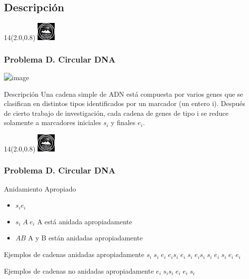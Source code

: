 \documentclass[10pt,xcolor=tables,{dvipsnames}]{beamer}
\newcommand{\MyLogo}{%
	\begin{textblock}{14}(2.0,0.8)
		\includegraphics[height=0.925cm, angle=0]{UOWhite}
	\end{textblock}
}
\begin{document}
   	\subsection{Descripción}
     
         	
    	    	\begin{frame}
    	    		\MyLogo
    	    		\frametitle{Problema D. Circular DNA}
    	    		\begin{center}
    	    		\includegraphics<1->[scale=0.1]{DNAFoto}
    	    		\end{center}
    	    		\begin{block}{Descripción}
    	    			\justifying
    	    			Una cadena simple de ADN está compuesta por varios genes que se clasifican en distintos tipos identificados por un marcador (un entero i). Después de cierto trabajo de investigación, cada cadena de genes de tipo i se reduce solamente a marcadores iniciales $s_i$ y finales $e_i$.    
    	    		\end{block} 
    	    	\end{frame}
    	    	
    
       	    	\begin{frame}
       	    		\MyLogo
       	    		\frametitle{Problema D. Circular DNA}
      	    		\begin{block}{Anidamiento Apropiado}
       	    		  \begin{itemize}
       	    		  	\item $s_ie_i$
       	    		  	\item $s_i\;A\;e_i$\hspace{0,5cm}  A está anidada apropiadamente
       	    		  	\item $AB$ \hspace{0,8cm} A y B están anidadas apropiadamente
       	    		  \end{itemize}
      	    		\end{block}
      	    		       	\begin{block}{Ejemplos de cadenas anidadas apropiadamente}
      	    		       		$s_i \; s_i \; e_i \; e_i $\hspace{1cm}$s_i \; e_i \; s_i \; e_i$\hspace{1cm}$s_i \; s_i \; e_i \; s_i \; e_i \; e_i$
      	    		       	\end{block}
      	    		       	\begin{block}{Ejemplos de cadenas no anidadas apropiadamente}
      	    		       		$e_i \; s_i $\hspace{1cm}$s_i \; e_i \; e_i \; s_i$
      	    		       	\end{block}
       	    	\end{frame}
    	
\end{document}
